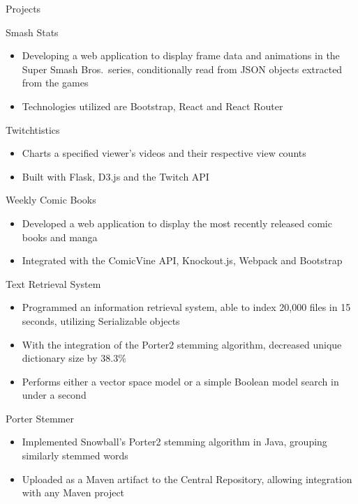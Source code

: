 \documentclass[]{xjavathehutt}
\begin{document}
\begin{cvsection}{Projects}
  \begin{cvsubsection}{Smash Stats}{}{}
    \begin{itemize}
      \item{Developing a web application to display frame data and animations in the Super Smash Bros.\ series, conditionally read from JSON objects extracted from the games}
      \item{Technologies utilized are Bootstrap, React and React Router}
    \end{itemize}
  \end{cvsubsection}

  \begin{cvsubsection}{Twitchtistics}{}{}
    \begin{itemize}
      \item{Charts a specified viewer's videos and their respective view counts}
      \item{Built with Flask, D3.js and the Twitch API}
    \end{itemize}
  \end{cvsubsection}

  \begin{cvsubsection}{Weekly Comic Books}{}{}
    \begin{itemize}
      \item{Developed a web application to display the most recently released comic books and manga}
      \item{Integrated with the ComicVine API, Knockout.js, Webpack and Bootstrap}
    \end{itemize}
  \end{cvsubsection}

  \begin{cvsubsection}{Text Retrieval System}{}{}
    \begin{itemize}
      \item{Programmed an information retrieval system, able to index 20,000 files in 15 seconds, utilizing Serializable objects}
      \item{With the integration of the Porter2 stemming algorithm, decreased unique dictionary size by 38.3\%}
      \item{Performs either a vector space model or a simple Boolean model search in under a second}
    \end{itemize}
  \end{cvsubsection}

  \begin{cvsubsection}{Porter Stemmer}{}{}
    \begin{itemize}
      \item{Implemented Snowball's Porter2 stemming algorithm in Java, grouping similarly stemmed words}
      \item{Uploaded as a Maven artifact to the Central Repository, allowing integration with any Maven project}
    \end{itemize}
  \end{cvsubsection}
\end{cvsection}
\end{document}

